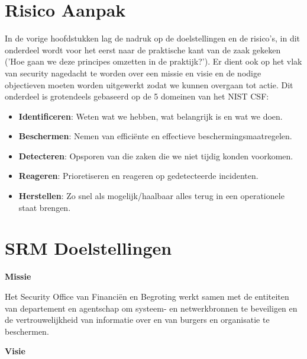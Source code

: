 \documentclass[11pt]{article}
\begin{document}
\section{Risico Aanpak}
\label{sec:org1f0d780}
In de vorige hoofdstukken lag de nadruk op de doelstellingen en de risico's, in dit onderdeel wordt voor het eerst naar de praktische kant van de zaak gekeken ('Hoe gaan we deze principes omzetten in de praktijk?').
Er dient ook op het vlak van security nagedacht te worden over een missie en visie en de nodige objectieven moeten worden uitgewerkt zodat we kunnen overgaan tot actie. Dit onderdeel is grotendeels gebaseerd op de 5 domeinen van het NIST CSF:
\begin{itemize}
\item \textbf{Identificeren}: Weten wat we hebben, wat belangrijk is en wat we doen.
\item \textbf{Beschermen}: Nemen van efficiënte en effectieve beschermingsmaatregelen.
\item \textbf{Detecteren}: Opsporen van die zaken die we niet tijdig konden voorkomen.
\item \textbf{Reageren}: Prioretiseren en reageren op gedetecteerde incidenten.
\item \textbf{Herstellen}: Zo snel als mogelijk/haalbaar alles terug in een operationele staat brengen.
\end{itemize}

\section{SRM Doelstellingen}
\label{sec:org57c6f3f}

\textbf{Missie}

Het Security Office van Financiën en Begroting werkt samen met de entiteiten van departement en agentschap om systeem- en netwerkbronnen te beveiligen en de vertrouwelijkheid van informatie over en van burgers en organisatie te beschermen.

\textbf{Visie}
\end{document}
